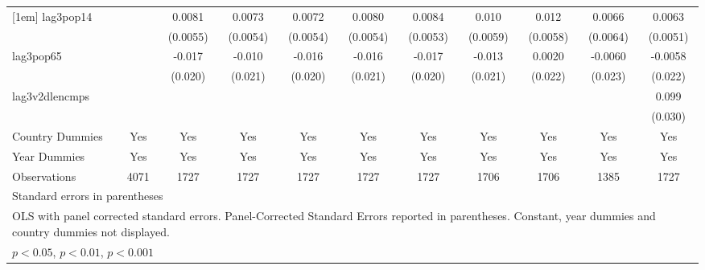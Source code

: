 \begin{table}[htbp]
\begin{tabular}{l*{10}{c}}
[1em]
lag3pop14           &                     &      0.0081         &      0.0073         &      0.0072         &      0.0080         &      0.0084         &       0.010         &       0.012\sym{*}  &      0.0066         &      0.0063         \\
                    &                     &    (0.0055)         &    (0.0054)         &    (0.0054)         &    (0.0054)         &    (0.0053)         &    (0.0059)         &    (0.0058)         &    (0.0064)         &    (0.0051)         \\
[1em]
lag3pop65           &                     &      -0.017         &      -0.010         &      -0.016         &      -0.016         &      -0.017         &      -0.013         &      0.0020         &     -0.0060         &     -0.0058         \\
                    &                     &     (0.020)         &     (0.021)         &     (0.020)         &     (0.021)         &     (0.020)         &     (0.021)         &     (0.022)         &     (0.023)         &     (0.022)         \\
[1em]
lag3v2dlencmps      &                     &                     &                     &                     &                     &                     &                     &                     &                     &       0.099\sym{**} \\
                    &                     &                     &                     &                     &                     &                     &                     &                     &                     &     (0.030)         \\
[1em]
Country Dummies     &         Yes         &         Yes         &         Yes         &         Yes         &         Yes         &         Yes         &         Yes         &         Yes         &         Yes         &         Yes         \\
[1em]
Year Dummies        &         Yes         &         Yes         &         Yes         &         Yes         &         Yes         &         Yes         &         Yes         &         Yes         &         Yes         &         Yes         \\
\hline
Observations        &        4071         &        1727         &        1727         &        1727         &        1727         &        1727         &        1706         &        1706         &        1385         &        1727         \\
\hline\hline
\multicolumn{11}{l}{\footnotesize Standard errors in parentheses}\\
\multicolumn{11}{l}{\footnotesize OLS with panel corrected standard errors. Panel-Corrected Standard Errors reported in parentheses. Constant, year dummies and country dummies not displayed.}\\
\multicolumn{11}{l}{\footnotesize \sym{*} \(p<0.05\), \sym{**} \(p<0.01\), \sym{***} \(p<0.001\)}\\
\end{tabular}
\end{table}
